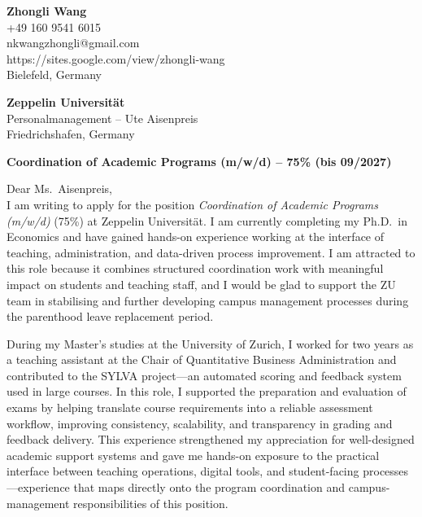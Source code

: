 \documentclass[11pt]{article}
\begin{document}
\noindent
\textbf{Zhongli Wang} \\
+49 160 9541 6015 \\
nkwangzhongli@gmail.com \\
https://sites.google.com/view/zhongli-wang \\
Bielefeld, Germany \\

\vspace{0.5cm}

\noindent
\textbf{Zeppelin Universität} \\
Personalmanagement -- Ute Aisenpreis \\
Friedrichshafen, Germany \\

\vspace{0.5cm}

\noindent
\textbf{Coordination of Academic Programs (m/w/d) -- 75\% (bis 09/2027)} \\

\vspace{0.3cm}

\noindent Dear Ms.\ Aisenpreis,\\[0.2cm]

I am writing to apply for the position \textit{Coordination of Academic Programs (m/w/d)} (75\%) at Zeppelin Universität. 
I am currently completing my Ph.D.\ in Economics and have gained hands-on experience working at the interface of teaching, administration, and data-driven process improvement. 
I am attracted to this role because it combines structured coordination work with meaningful impact on students and teaching staff, and I would be glad to support the ZU team in stabilising and further developing campus management processes during the parenthood leave replacement period.

During my Master’s studies at the University of Zurich, I worked for two years as a teaching assistant at the Chair of Quantitative Business Administration and contributed to the SYLVA project—an automated scoring and feedback system used in large courses. In this role, I supported the preparation and evaluation of exams by helping translate course requirements into a reliable assessment workflow, improving consistency, scalability, and transparency in grading and feedback delivery. This experience strengthened my appreciation for well-designed academic support systems and gave me hands-on exposure to the practical interface between teaching operations, digital tools, and student-facing processes—experience that maps directly onto the program coordination and campus-management responsibilities of this position.
\end{document}
